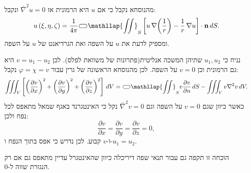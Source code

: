 \documentclass{tstextbook}
\begin{document}
\begin{proposition}
מהנוסחא נקבל כי אם \(u\) היא הרמונית אז \(\bar{\nabla}^2u=0\)  ונקבל:
$$u\left( \xi,\eta,\zeta \right)=\frac{1}{4\pi}{\subset\!\supset} \mathllap{\iint}_{S}\left[u\,\nabla\!\left(\frac{1}{r}\right)-\frac{1}{r}\,\nabla u\right]\cdot\mathbf{n}\,d S.$$
ומספיק לדעת את \(u\) על השפה ואת הגרדיאנט של \(u\) על השפה. 

\end{proposition}
\begin{corollary}
נניח כי \(u_{1},u_{2}\) שתיהן המשכה אנליטית(פתרונות של משוואת לפלס). לכן \(v=u_{1}-u_{2}\) היא גם הרמונית וכן \(v=0\) על השפה. לכן מהנוסחא הראשונה של גרין עבור \(\varphi=\chi=v\) נקבל:
$$\iiint_{V}\left[\left({\frac{\partial v}{\partial x}}\right)^{2}+\left({\frac{\partial v}{\partial y}}\right)^{2}+\left({\frac{\partial v}{\partial z}}\right)^{2}\right]\,d V={\subset\!\supset} \mathllap{\iint}_{S}v{\frac{\partial v}{\partial n}}\,d S-\iiint_{V}v\nabla^{2}v\,d V.$$
כאשר כיוון שגם \(v=0\) על השפה וגם \(\bar{\nabla}^2v=0\) נקל כי האינטגרנד באגף שמאל מתאפס לכל נפח ולכן:
$${\frac{\partial v}{\partial x}}={\frac{\partial v}{\partial y}}={\frac{\partial v}{\partial z}}=0,$$
ו-\(v\) קבוע. לכן נדרש כי אפס בתוך הנפח ו-\(u_{1}=u_{2}\).

\end{corollary}
\begin{remark}
הוכחה זו תקפה גם עבור תנאי שפה דיריכלה כיוון שהאינטגרל עדיין מתאפס גם אם רק הנגזרת שווה ל-0.

\end{remark}
\end{document}
